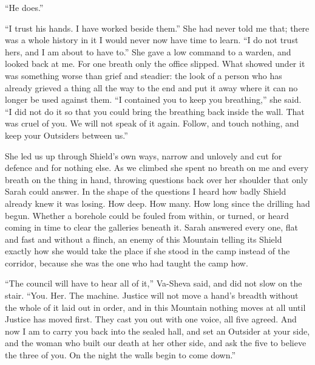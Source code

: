 ``He does.''\par

``I trust his hands. I have worked beside them.'' She had never told me that; there was a whole history in it I would never now have time to learn. ``I do not trust hers, and I am about to have to.'' She gave a low command to a warden, and looked back at me. For one breath only the office slipped. What showed under it was something worse than grief and steadier: the look of a person who has already grieved a thing all the way to the end and put it away where it can no longer be used against them. ``I contained you to keep you breathing,'' she said. ``I did not do it so that you could bring the breathing back inside the wall. That was cruel of you. We will not speak of it again. Follow, and touch nothing, and keep your Outsiders between us.''\par

\ornament

She led us up through Shield's own ways, narrow and unlovely and cut for defence and for nothing else. As we climbed she spent no breath on me and every breath on the thing in hand, throwing questions back over her shoulder that only Sarah could answer. In the shape of the questions I heard how badly Shield already knew it was losing. How deep. How many. How long since the drilling had begun. Whether a borehole could be fouled from within, or turned, or heard coming in time to clear the galleries beneath it. Sarah answered every one, flat and fast and without a flinch, an enemy of this Mountain telling its Shield exactly how she would take the place if she stood in the camp instead of the corridor, because she was the one who had taught the camp how.\par

``The council will have to hear all of it,'' Va-Sheva said, and did not slow on the stair. ``You. Her. The machine. Justice will not move a hand's breadth without the whole of it laid out in order, and in this Mountain nothing moves at all until Justice has moved first. They cast you out with one voice, all five agreed. And now I am to carry you back into the sealed hall, and set an Outsider at your side, and the woman who built our death at her other side, and ask the five to believe the three of you. On the night the walls begin to come down.''\par

